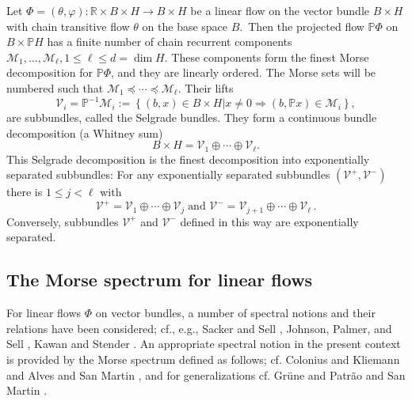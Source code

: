 	\begin{theorem}
		\label{Theorem_Selgrade}Let $\Phi=(\theta,\varphi):\mathbb{R}\times B\times
		H\rightarrow B\times H$ be a linear flow on the vector bundle $B\times H$ with
		chain transitive flow $\theta$ on the base space $B$.\ Then the projected flow
		$\mathbb{P}\Phi$ on $B\times\mathbb{P}H$ has a finite number of chain
		recurrent components $\mathcal{M}_{1},\ldots,\mathcal{M}_{\ell},1\leq\ell\leq
		d=\dim H$. These components form the finest Morse decomposition for
		$\mathbb{P}\Phi$, and they are linearly ordered. The Morse sets will be
		numbered such that $\mathcal{M}_{1}\preceq\cdots\preceq\mathcal{M}_{\ell}$.
		Their lifts
		\[
		\mathcal{V}_{i}=\mathbb{P}^{-1}\mathcal{M}_{i}:=\left\{  (b,x)\in B\times
		H\left\vert x\not =0\Rightarrow(b,\mathbb{P}x)\in\mathcal{M}_{i}\right.
		\right\}  ,
		\]
		are subbundles, called the Selgrade bundles. They form a continuous bundle
		decomposition (a Whitney sum)
		\[
		B\times H=\mathcal{V}_{1}\oplus\cdots\oplus\mathcal{V}_{\ell}.
		\]
		This Selgrade decomposition is the finest decomposition into exponentially
		separated subbundles: For any exponentially separated subbundles
		$(\mathcal{V}^{+},\mathcal{V}^{-})$ there is $1\leq j<\ell$ with
		\[
		\mathcal{V}^{+}=\mathcal{V}_{1}\oplus\cdots\oplus\mathcal{V}_{j}%
		\;\mbox{and\ }\mathcal{V}^{-}=\mathcal{V}_{j+1}\oplus\cdots\oplus
		\mathcal{V}_{\ell}\,.
		\]
		Conversely, subbundles $\mathcal{V}^{+}$ and $\mathcal{V}^{-}$ defined in this
		way are exponentially separated.
	\end{theorem}
	
	\subsection{The Morse spectrum for linear flows\label{Subsection2.4}}
	
	For linear flows $\Phi$ on vector bundles, a number of spectral notions and
	their relations have been considered; cf., e.g., Sacker and Sell \cite{SacS},
	Johnson, Palmer, and Sell \cite{JoPS87}, Kawan and Stender \cite{KawS12}. An
	appropriate spectral notion in the present context is provided by the Morse
	spectrum defined as follows; cf. Colonius and Kliemann \cite{ColK14} and Alves
	and San Martin \cite{AlvSM16}, and for generalizations cf. Gr\"{u}ne
	\cite{Grue00} and Patr\~{a}o and San Martin \cite{PatSM07}.
	

